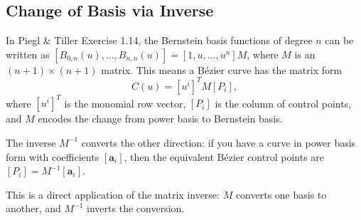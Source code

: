 \subsection*{Change of Basis via Inverse}

\begin{remark*}
In Piegl \& Tiller Exercise 1.14, the Bernstein basis functions of degree $n$
can be written as $[B_{0,n}(u), \ldots, B_{n,n}(u)] = [1, u, \ldots, u^n] M$,
where $M$ is an $(n+1) \times (n+1)$ matrix.
This means a B\'{e}zier curve has the matrix form
\[
  C(u) = [u^i]^T M [P_i],
\]
where $[u^i]^T$ is the monomial row vector, $[P_i]$ is the column of control points,
and $M$ encodes the change from power basis to Bernstein basis.

The inverse $M^{-1}$ converts the other direction: if you have a curve in
power basis form with coefficients $[\mathbf{a}_i]$, then the equivalent
B\'{e}zier control points are $[P_i] = M^{-1}[\mathbf{a}_i]$.

This is a direct application of the matrix inverse: $M$ converts one basis
to another, and $M^{-1}$ inverts the conversion.
\end{remark*}
